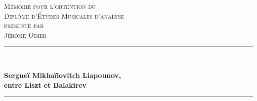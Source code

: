 \begin{titlepage}
\begin{bigcenter}

\vspace*{3.5cm}


\textsc{\Large Mémoire pour l'obtention du}\\[0.2cm]
\textsc{\Large Diplôme d'Études Musicales d'analyse}\\[0.2cm]
\textsc{\large présenté par}\\[0.2cm]
\textsc{\LARGE Jérôme Odier}


\vspace{2.5cm}


\begin{minipage}{1.0\linewidth}
  \rule{\linewidth}{0.5mm}\\[0.4cm]
  \begin{center}
    {\huge \bfseries Sergueï Mikhaïlovitch Liapounov,}\\[0.4cm]
    {\huge \bfseries entre Liszt et Balakirev}\\[0.4cm]
  \rule{\linewidth}{0.5mm}\\
  \end{center}
\end{minipage}


\end{bigcenter}
\end{titlepage}
